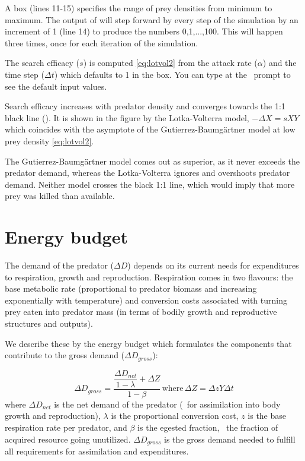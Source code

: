 A  box  (lines 11-15) specifies the range of prey densities from minimum to maximum. The  output of  will step forward by every step of the simulation by an increment of 1 (line 14) to produce the numbers 0,1,...,100. This will happen three times, once for each iteration of the simulation.

The search efficacy ($s$) is computed \eqref{eq:lotvol2} from the attack rate ($\alpha$) and the time step ($\Delta t$) which defaults to 1 in the  box. You can type  at the \US\ prompt to see the default input values. 

Search efficacy increases with predator density and converges towards the 1:1 black line (). It is shown in the figure by the Lotka-Volterra model, $-\Delta X = sXY$ which coincides with the asymptote of the Gutierrez-Baumg{\"a}rtner model at low prey density \eqref{eq:lotvol2}. 

The Gutierrez-Baumg{\"a}rtner model comes out as superior, as it never exceeds the predator demand, whereas the Lotka-Volterra ignores and overshoots predator demand. Neither model crosses the black 1:1 line, which would imply that more prey was killed than available.


\section{Energy budget}
\label{ch:trophic-energy-budget}

The demand of the predator ($\Delta D$) depends on its current needs for expenditures to respiration, growth and reproduction. Respiration comes in two flavours: the base metabolic rate (proportional to predator biomass and increasing exponentially with temperature) and conversion costs associated with turning prey eaten into predator mass (in terms of bodily growth and reproductive structures and outputs).

We describe these by the energy budget \citep{GutiConc81} which formulates the components that contribute to the gross demand ($\Delta D_{gross}$):

\begin{equation}
\Delta D_{gross} = \dfrac{ \dfrac{\Delta D_{net}}{1-\lambda}+\Delta Z}{1-\beta}\, \text{where}\, \Delta Z = \Delta z Y \Delta t
\label{eq:demandbudget}
\end{equation}
where $\Delta D_{net}$ is the net demand of the predator (\eg\ for assimilation into body growth and reproduction), $\lambda$ is the proportional conversion cost, $z$ is the base respiration rate per predator, and $\beta$ is the egested fraction, \ie\ the fraction of acquired resource going unutilized. $\Delta D_{gross}$ is the gross demand needed to fulfill all requirements for assimilation and expenditures.

